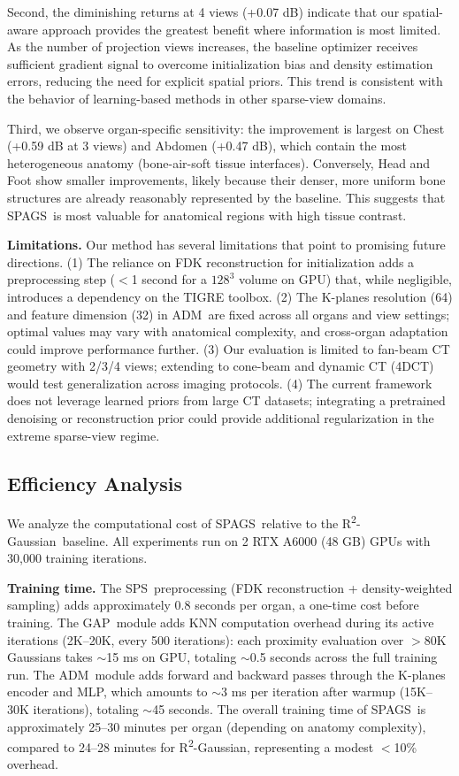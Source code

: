 \documentclass{egPublStyle}
\newcommand{\spags}{SPAGS}
\newcommand{\sps}{SPS}
\newcommand{\gap}{GAP}
\newcommand{\adm}{ADM}
\newcommand{\rtwo}{R\textsuperscript{2}-Gaussian}
\begin{document}
Second, the diminishing returns at 4 views (+0.07 dB) indicate that our spatial-aware approach provides the greatest benefit where information is most limited. As the number of projection views increases, the baseline optimizer receives sufficient gradient signal to overcome initialization bias and density estimation errors, reducing the need for explicit spatial priors. This trend is consistent with the behavior of learning-based methods in other sparse-view domains.

Third, we observe organ-specific sensitivity: the improvement is largest on Chest (+0.59 dB at 3 views) and Abdomen (+0.47 dB), which contain the most heterogeneous anatomy (bone-air-soft tissue interfaces). Conversely, Head and Foot show smaller improvements, likely because their denser, more uniform bone structures are already reasonably represented by the baseline. This suggests that \spags\ is most valuable for anatomical regions with high tissue contrast.

\textbf{Limitations.} Our method has several limitations that point to promising future directions. (1) The reliance on FDK reconstruction for initialization adds a preprocessing step ($<$1 second for a $128^3$ volume on GPU) that, while negligible, introduces a dependency on the TIGRE toolbox. (2) The K-planes resolution (64) and feature dimension (32) in \adm\ are fixed across all organs and view settings; optimal values may vary with anatomical complexity, and cross-organ adaptation could improve performance further. (3) Our evaluation is limited to fan-beam CT geometry with 2/3/4 views; extending to cone-beam and dynamic CT (4DCT) would test generalization across imaging protocols. (4) The current framework does not leverage learned priors from large CT datasets; integrating a pretrained denoising or reconstruction prior could provide additional regularization in the extreme sparse-view regime.

\subsection{Efficiency Analysis}
\label{sec:efficiency}

We analyze the computational cost of \spags\ relative to the \rtwo\ baseline. All experiments run on 2 RTX A6000 (48 GB) GPUs with 30,000 training iterations.

\textbf{Training time.} The \sps\ preprocessing (FDK reconstruction + density-weighted sampling) adds approximately 0.8 seconds per organ, a one-time cost before training. The \gap\ module adds KNN computation overhead during its active iterations (2K--20K, every 500 iterations): each proximity evaluation over $>$80K Gaussians takes $\sim$15 ms on GPU, totaling $\sim$0.5 seconds across the full training run. The \adm\ module adds forward and backward passes through the K-planes encoder and MLP, which amounts to $\sim$3 ms per iteration after warmup (15K--30K iterations), totaling $\sim$45 seconds. The overall training time of \spags\ is approximately 25--30 minutes per organ (depending on anatomy complexity), compared to 24--28 minutes for \rtwo, representing a modest $<$10\% overhead.
\end{document}
